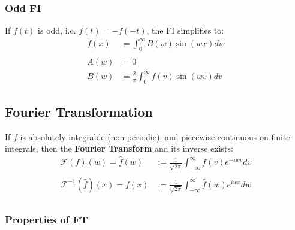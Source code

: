\subsubsection{Odd FI}
If $f(t)$ is odd, i.e. $f(t)=-f(-t)$, the FI simplifies to:
\begin{align*}
    f(x) & =\int_0^\infty B(w)\sin(wx)dw          \\\\
    A(w) & =0                                     \\
    B(w) & =\frac2\pi\int_0^\infty f(v)\sin(wv)dv
\end{align*}

\subsection{Fourier Transformation}
If $f$ is absolutely integrable (non-periodic), and piecewise continuous on finite integrals,
then the \textbf{Fourier Transform} and its inverse exists:
\begin{align*}
    \mathcal{F}(f)(w)=\widehat{f}(w)      & :=\frac1{\sqrt{2\pi}}\int_{-\infty}^{\infty}f(v)e^{-iwv}dv          \\\\
    \mathcal{F}^{-1}(\widehat{f})(x)=f(x) & :=\frac1{\sqrt{2\pi}}\int_{-\infty}^{\infty}\widehat{f}(w)e^{iwx}dw \\
\end{align*}
\subsubsection{Properties of FT}

